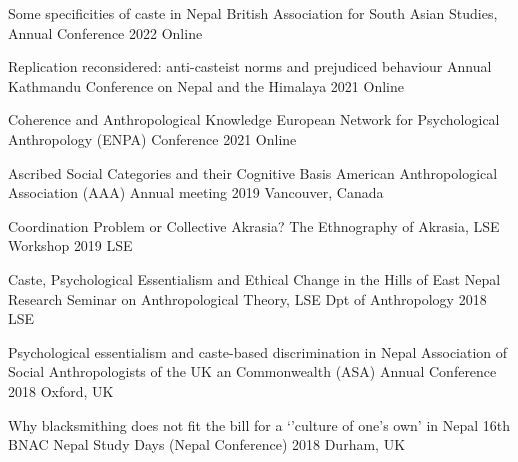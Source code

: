 

\begin{cvpresentations}



  \cvpresentation
    {Some specificities of caste in Nepal} %
    {British Association for South Asian Studies, Annual Conference} %
    {2022} %
    {Online} %

  \cvpresentation
    {Replication reconsidered: anti-casteist norms and prejudiced behaviour} %
    {Annual Kathmandu Conference on Nepal and the Himalaya} %
    {2021} %
    {Online} %

  \cvpresentation
    {Coherence and Anthropological Knowledge} %
    {European Network for Psychological Anthropology (ENPA) Conference} %
    {2021} %
    {Online} %

  \cvpresentation
    {Ascribed Social Categories and their Cognitive Basis} %
    {American Anthropological Association (AAA) Annual meeting} %
    {2019} %
    {Vancouver, Canada} %

  \cvpresentation
    {Coordination Problem or Collective Akrasia?} %
    {The Ethnography of Akrasia, LSE Workshop} %
    {2019} %
    {LSE} %

  \cvpresentation
    {Caste, Psychological Essentialism and Ethical Change in the Hills of East Nepal} %
    {Research Seminar on Anthropological Theory, LSE Dpt of Anthropology} %
    {2018} %
    {LSE} %


  \cvpresentation
    {Psychological essentialism and caste-based discrimination in Nepal} %
    {Association of Social Anthropologists of the UK an Commonwealth (ASA) Annual Conference} %
    {2018} %
    {Oxford, UK} %


  \cvpresentation
    {Why blacksmithing does not fit the bill for a `'culture of one's own' in Nepal} %
    {16th BNAC Nepal Study Days (Nepal Conference)} %
    {2018} %
    {Durham, UK} %

\end{cvpresentations}
